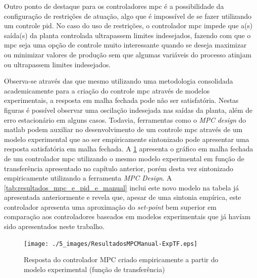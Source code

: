Outro ponto de destaque para os controladores \acrshort{mpc} é a possibilidade da configuração de
restrições de atuação, algo que é impossível de se fazer utilizando um controle \acrshort{pid}.
No caso do uso de restrições, o controlador \acrshort{mpc} impede que a(s) saída(s) da planta controlada
ultrapassem limites indesejados, fazendo com que o \acrshort{mpc} seja uma opção de controle muito
interessante quando se deseja maximizar ou minimizar valores de produção sem que algumas variáveis
do processo atinjam ou ultrapassem limites indesejados.

Observa-se através das  que mesmo utilizando
uma metodologia consolidada academicamente para a criação do controle \acrshort{mpc} através de modelos
experimentais, a resposta em malha fechada pode não ser satisfatória. Nestas figuras é possível 
observar uma oscilação indesejada nas saídas da planta, além de erro estacionário em alguns casos.
Todavia, ferramentas como o \textit{MPC design} do \acrshort{matlab} podem auxiliar no desenvolvimento
de um controle \acrshort{mpc} através de um modelo experimental que ao ser empiricamente sintonizado
pode apresentar uma resposta satisfatória em malha fechada. A \cref{fig:resultadosmpcmanual-exptf}
apresenta o gráfico em malha fechada de um controlador \acrshort{mpc} utilizando o mesmo modelo experimental em
função de transferência apresentado no capítulo anterior, porém desta vez sintonizado empiricamente utilizando
a ferramenta \textit{MPC Design}. A \cref{tab:resultados_mpc_e_pid_e_manual} inclui este novo modelo 
na tabela já apresentada anteriormente e revela que, apesar de uma sintonia empírica, este controlador
apresenta uma aproximação do \textit{set-point} bem superior em comparação aos controladores baseados em 
modelos experimentais que já havíam sido apresentados neste trabalho.

\begin{figure}[!h]
	\caption{Resposta do controlador MPC criado empiricamente a partir do modelo experimental (função de transferência)}
	\begin{center}
		\texttt{[image: ./5\_images/ResultadosMPCManual-ExpTF.eps]} 
		\label{fig:resultadosmpcmanual-exptf}
	\end{center}
	\centering
\end{figure}


